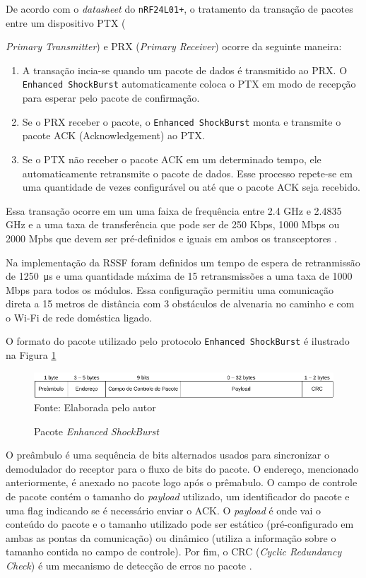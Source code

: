 De acordo com o \textit{datasheet} do \texttt{nRF24L01+}, o tratamento da transação de pacotes entre um
dispositivo PTX ({\textit{Primary Transmitter}) e PRX (\textit{Primary Receiver}) ocorre da
seguinte maneira:

\begin{enumerate}
	\item A transação incia-se quando um pacote de dados é transmitido ao PRX. O
		\texttt{Enhanced ShockBurst} automaticamente coloca o PTX em modo de recepção para esperar
		pelo pacote de confirmação.
	\item Se o PRX receber o pacote, o \texttt{Enhanced ShockBurst} monta e transmite o pacote ACK
		(Acknowledgement) ao PTX.
	\item Se o PTX não receber o pacote ACK em um determinado tempo, ele automaticamente retransmite o
		pacote de dados. Esse processo repete-se em uma quantidade de vezes configurável ou até que o
		pacote ACK seja recebido.
\end{enumerate}

Essa transação ocorre em um uma faixa de frequência entre 2.4 GHz e 2.4835 GHz e a uma taxa de transferência
que pode ser de 250 Kbps, 1000 Mbps ou 2000 Mpbs que devem ser pré-definidos e iguais em ambos os
transceptores \cite{nrfdatasheet}.

Na implementação da RSSF foram definidos um tempo de espera de retranmissão de \SI{1250}{\micro \second} e uma
quantidade máxima de 15 retransmissões a uma taxa de 1000 Mbps para todos os módulos. Essa configuração
permitiu uma comunicação direta a 15 metros de distância com 3 obstáculos de alvenaria no caminho e com o
Wi-Fi de rede doméstica ligado.

O formato do pacote utilizado pelo protocolo \texttt{Enhanced ShockBurst} é ilustrado na Figura
\ref{figura:package}

\begin{figure}[h!]
	\caption{Pacote \textit{Enhanced ShockBurst}}
	\centering
	\includegraphics[scale=0.5]{../images/pacote.png}
	\hspace{\linewidth}
	Fonte: Elaborada pelo autor
	\label{figura:package}
\end{figure}

O preâmbulo é uma sequência de bits alternados usados para sincronizar o demodulador do receptor para o fluxo
de bits do pacote. O endereço, mencionado anteriormente, é anexado no pacote logo após o prêmabulo. O campo de
controle de pacote contém o tamanho do \textit{payload} utilizado, um identificador do pacote e uma flag
indicando se é necessário enviar o ACK. O \textit{payload} é onde vai o conteúdo do pacote e o tamanho
utilizado pode ser estático (pré-configurado em ambas as pontas da comunicação) ou dinâmico (utiliza a
informação sobre o tamanho contida no campo de controle). Por fim, o CRC (\textit{Cyclic Redundancy Check}) é
um mecanismo de detecção de erros no pacote \cite{nrfdatasheet}.

}
